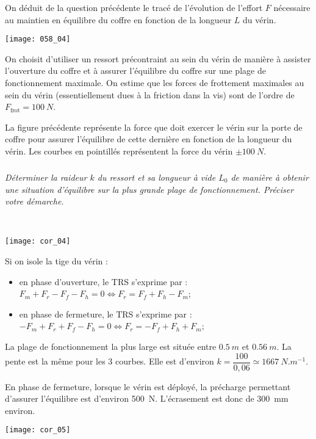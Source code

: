 On déduit de la question précédente le tracé de l’évolution de l’effort $F$ nécessaire au maintien en équilibre du coffre en fonction de la longueur $L$ du vérin.


\begin{center}
\texttt{[image: 058\_04]}
\end{center}

On choisit d’utiliser un ressort précontraint au sein du vérin de manière à assister l’ouverture du coffre et à assurer l’équilibre du coffre sur une plage de fonctionnement maximale. On estime que les forces de frottement maximales au sein du vérin (essentiellement dues à la friction dans la vis) sont de l’ordre de $F_{\text{frot}}=\SI{100}{N}$. 

La figure précédente représente la force que doit exercer le vérin sur la porte de coffre pour assurer l’équilibre de cette dernière en fonction de la longueur du vérin. Les courbes en pointillés représentent la force du vérin $\pm\SI{100}{N}$.
\fi




\subparagraph{}
\textit{Déterminer la raideur $k$ du ressort et sa longueur à vide $L_0$ de manière à obtenir une situation d’équilibre
sur la plus grande plage de fonctionnement. Préciser votre démarche.}
\ifprof
\begin{corrige}~\\

\begin{center}
\texttt{[image: cor\_04]}
\end{center}

Si on isole la tige du vérin :
\begin{itemize}
\item en phase d'ouverture, le TRS s'exprime par : $F_m + F_r - F_f - F_h =0\Leftrightarrow F_r = F_f + F_h - F_m$; 
\item en phase de fermeture, le TRS s'exprime par : $-F_m + F_r + F_f - F_h =0 \Leftrightarrow F_r = -F_f + F_h + F_m$;
\end{itemize}





La plage de fonctionnement la plus large est située entre $\SI{0,5}{m}$ et $\SI{0,56}{m}$. La pente est la même pour les 3 courbes. Elle est d'environ $k=\dfrac{100}{0,06}\simeq \SI{1667}{N.m^{-1}}$.

En phase de fermeture, lorsque le vérin est déployé, la précharge permettant d'assurer l'équilibre est d'environ \SI{500}{N}.  L'écrasement est donc  de \SI{300}{mm} environ.

\end{corrige}
\begin{center}
\texttt{[image: cor\_05]}
\end{center}
\else
\fi

